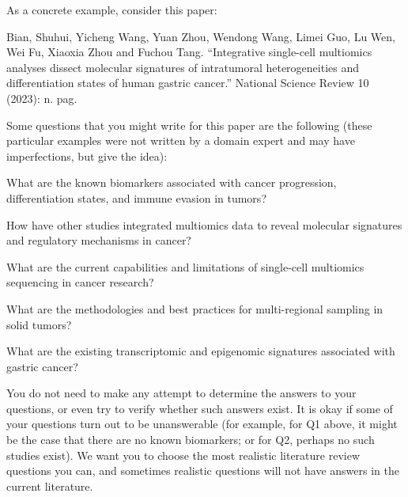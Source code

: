 \begin{table}[h!]
\begin{tcolorbox}
As a concrete example, consider this paper:

\tcblower
Bian, Shuhui, Yicheng Wang, Yuan Zhou, Wendong Wang, Limei Guo, Lu Wen, Wei Fu, Xiaoxia Zhou and Fuchou Tang. ``Integrative single-cell multiomics analyses dissect molecular signatures of intratumoral heterogeneities and differentiation states of human gastric cancer.'' National Science Review 10 (2023): n. pag.

Some questions that you might write for this paper are the following (these particular examples were not written by a domain expert and may have imperfections, but give the idea):

What are the known biomarkers associated with cancer progression, differentiation states, and immune evasion in tumors? 

How have other studies integrated multiomics data to reveal molecular signatures and regulatory mechanisms in cancer?

What are the current capabilities and limitations of single-cell multiomics sequencing in cancer research?

What are the methodologies and best practices for multi-regional sampling in solid tumors?

What are the existing transcriptomic and epigenomic signatures associated with gastric cancer?

\tcblower
You do not need to make any attempt to determine the answers to your questions, or even try to verify whether such answers exist.  It is okay if some of your questions turn out to be unanswerable (for example, for Q1 above, it might be the case that there are no known biomarkers; or for Q2, perhaps no such studies exist).  We want you to choose the most realistic literature review questions you can, and sometimes realistic questions will not have answers in the current literature.
\end{tcolorbox}
\caption{\label{tab:annotator instructions_biomed} {\bf \textsc{ScholarQA-Bio}, \textsc{Neuro} annotation instructions}:Instructions given to our expert annotators for authoring questions in biomedicine. The example questions in this passage were composed with assistance from GPT. }
\end{table}



